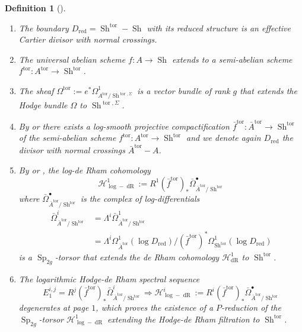 \documentclass[11pt]{amsart}
\numberwithin{subsection}{section}
\numberwithin{figure}{section}
\numberwithin{table}{section}
\theoremstyle{1}
\newtheorem{definition}[theorem]{Definition}
\theoremstyle{2}
\DeclareMathOperator{\Sp}{Sp}
\DeclareMathOperator{\Sh}{Sh}
\DeclareMathOperator{\dR}{dR}
\DeclareMathOperator{\tor}{tor}
\DeclareMathOperator{\red}{red}
\begin{document}
\begin{definition}[{\cite[Chapter 4]{MR1083353}\cite[Th. 2.15]{MR2968629}}]
\begin{enumerate}
\item The boundary $D_{\red} = \Sh^{\tor} - \Sh$ with its reduced structure is an effective Cartier divisor with normal crossings.
\item The universal abelian scheme $f : A \rightarrow \Sh$ extends to a semi-abelian scheme $f^{\tor} : A^{\tor} \rightarrow \Sh^{\tor}$.
\item The sheaf $\Omega^{\tor} := e^*\Omega^1_{A^{\tor}/\Sh^{\tor,\Sigma}}$ is a vector bundle of rank $g$ that extends the Hodge bundle $\Omega$ to $\Sh^{\tor,\Sigma}$.
\item By \cite[Chapter 4]{MR1083353} or \cite[Th. 2.15, (2)]{MR2968629} there exists a log-smooth projective compactification $\bar{f}^{\tor} : \bar{A}^{\tor} \rightarrow \Sh^{\tor}$ of the semi-abelian scheme $f^{\tor} : A^{\tor} \rightarrow \Sh^{\tor}$ and we denote again $D_{\red}$ the divisor with normal crossings $\bar{A}^{\tor} - A$.
\item By \cite[Chapter 4]{MR1083353} or \cite[Th. 2.15, (3)]{MR2968629}, the log-de Rham cohomology
\begin{equation*}
\mathcal{H}^1_{\log-\dR} := R^1{(\bar{f}^{\tor})}_*\bar{\Omega}^{\bullet}_{\bar{A}^{\tor}/\Sh^{\tor}}
\end{equation*}
where $\bar{\Omega}^{\bullet}_{\bar{A}^{\tor}/\Sh^{\tor}}$ is the complex of log-differentials
\begin{equation*}
\begin{aligned}
\bar{\Omega}^i_{\bar{A}^{\tor}/\Sh^{\tor}} &= \Lambda^i\bar{\Omega}^1_{\bar{A}^{\tor}/\Sh^{\tor}} \\
&=\Lambda^i\Omega^1_{\bar{A}^{\tor}}(\log D_{\red}) /  {(\bar{f}^{\tor})}^{*}  \Omega^1_{\Sh^{\tor}}(\log D_{\red})
\end{aligned}
\end{equation*}
is a $\Sp_{2g}$-torsor that extends the de Rham cohomology $\mathcal{H}^1_{\dR}$ to $\Sh^{\tor}$.
\item The logarithmic Hodge-de Rham spectral
sequence 
\begin{equation*}
E^{i,j}_1 = R^j{(\bar{f}^{\tor})}_*\bar{\Omega}^{i}_{\bar{A}^{\tor}/\Sh^{\tor}} \Rightarrow \mathcal{H}^i_{\log-\dR} := R^i{(\bar{f}^{\tor})}_*\bar{\Omega}^{\bullet}_{\bar{A}^{\tor}/\Sh^{\tor}}
\end{equation*}
degenerates at page $1$, which proves the existence of a $P$-reduction of the $\Sp_{2g}$-torsor $\mathcal{H}^1_{\log-\dR}$ extending the Hodge-de Rham filtration to $\Sh^{\tor}$.
\end{enumerate}
\end{definition}
\end{document}
